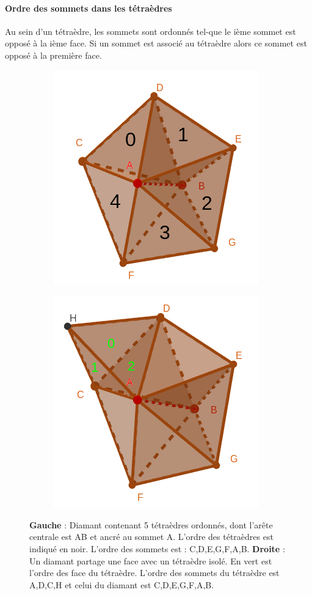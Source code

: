 \paragraph{Ordre des sommets dans les tétraèdres}
Au sein d'un tétraèdre, les sommets sont ordonnés tel-que le ième sommet est opposé à la ième face. Si un sommet est associé au tétraèdre alors ce sommet est opposé à la première face.
\begin{figure}[H]
\centering
\begin{subfigure}{.5\textwidth}
  \centering
  \includegraphics[scale=0.38]{Images/tetra_ordonnee}
  \caption{}
  \label{fig:tetra_ordonnee}
\end{subfigure}%
\begin{subfigure}{.5\textwidth}
  \centering
  \includegraphics[scale=0.4]{Images/permutation_tetra_diamant}
  \caption{}
  \label{fig:permutation_tetra_diamant}
\end{subfigure}
\caption{\textbf{Gauche} : Diamant contenant 5 tétraèdres ordonnés, dont l'arête centrale est AB et ancré au sommet A. L'ordre des tétraèdres est indiqué en noir. L'ordre des sommets est : C,D,E,G,F,A,B. \textbf{Droite} : Un diamant partage une face avec un tétraèdre isolé. En vert est l'ordre des face du tétraèdre. L'ordre des sommets du tétraèdre est A,D,C,H et celui du diamant est C,D,E,G,F,A,B.}
\end{figure}

